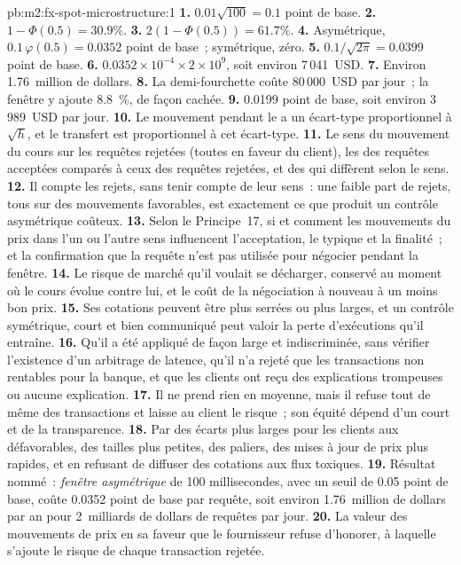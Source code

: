 \begin{solution}{pb:m2:fx-spot-microstructure:1}
\textbf{1.} $0.01\sqrt{100} = 0.1$ point de base.
\textbf{2.} $1 - \Phi(0.5) = 30.9\%$.
\textbf{3.} $2(1 - \Phi(0.5)) = 61.7\%$.
\textbf{4.} Asymétrique, $0.1\,\varphi(0.5) = 0.0352$ point de base~; symétrique,
zéro.
\textbf{5.} $0.1/\sqrt{2\pi} = 0.0399$ point de base.
\textbf{6.} $0.0352 \times 10^{-4} \times 2 \times 10^9$, soit environ 7\,041~USD.
\textbf{7.} Environ 1.76~million de dollars.
\textbf{8.} La demi-fourchette coûte 80\,000~USD par jour~; la fenêtre y ajoute 8.8~\%,
de façon cachée.
\textbf{9.} 0.0199 point de base, soit environ 3\,989~USD par jour.
\textbf{10.} Le mouvement pendant le  a un écart-type proportionnel à
$\sqrt h$, et le transfert est proportionnel à cet écart-type.
\textbf{11.} Le sens du mouvement du cours sur les requêtes rejetées (toutes en faveur du
client), les  des requêtes acceptées comparés à ceux des requêtes rejetées, et
des  qui diffèrent selon le sens.
\textbf{12.} Il compte les rejets, sans tenir compte de leur sens~: une faible part de rejets,
tous sur des mouvements favorables, est exactement ce que produit un contrôle asymétrique coûteux.
\textbf{13.} Selon le Principe~17, si et comment les mouvements du prix dans l'un ou l'autre
sens influencent l'acceptation, le  typique et la finalité~; et la confirmation
que la requête n'est pas utilisée pour négocier pendant la fenêtre.
\textbf{14.} Le risque de marché qu'il voulait se décharger, conservé au moment où le
cours évolue contre lui, et le coût de la négociation à nouveau à un moins bon prix.
\textbf{15.} Ses cotations peuvent être plus serrées ou plus larges, et un contrôle symétrique,
court et bien communiqué peut valoir la perte d'exécutions qu'il entraîne.
\textbf{16.} Qu'il a été appliqué de façon large et indiscriminée, sans vérifier
l'existence d'un arbitrage de latence, qu'il n'a rejeté que les transactions non rentables pour
la banque, et que les clients ont reçu des explications trompeuses ou aucune explication.
\textbf{17.} Il ne prend rien en moyenne, mais il refuse tout de même des transactions et
laisse au client le risque~; son équité dépend d'un  court et de la
transparence.
\textbf{18.} Par des écarts plus larges pour les clients aux  défavorables, des tailles plus petites,
des paliers, des mises à jour de prix plus rapides, et en refusant de diffuser des cotations aux flux toxiques.
\textbf{19.} Résultat nommé~: \emph{fenêtre asymétrique} de 100 millisecondes, avec
un seuil de 0.05 point de base, coûte 0.0352 point de base par requête, soit environ
1.76~million de dollars par an pour 2~milliards de dollars de requêtes par jour.
\textbf{20.} La valeur des mouvements de prix en sa faveur que le fournisseur refuse
d'honorer, à laquelle s'ajoute le risque de chaque transaction rejetée.
\end{solution}

